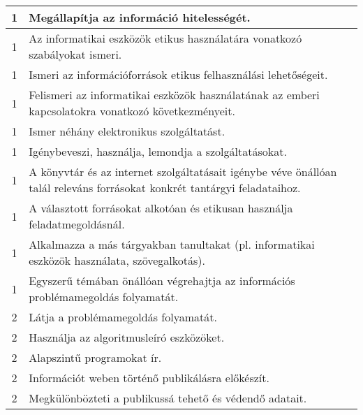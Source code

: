 \begin{longtable}{c | p{12cm} }
                                          1 &  Megállapítja az információ hitelességét. \\ \hline
                                          1 &  Az informatikai eszközök etikus használatára vonatkozó szabályokat ismeri. \\ \hline
                                          1 &  Ismeri az információforrások etikus felhasználási lehetőségeit. \\ \hline
                                          1 &  Felismeri az informatikai eszközök használatának az emberi kapcsolatokra vonatkozó következményeit. \\ \hline
                                          1 &  Ismer néhány elektronikus szolgáltatást. \\ \hline
                                          1 &  Igénybeveszi, használja, lemondja a szolgáltatásokat. \\ \hline
                                          1 &  A könyvtár és az internet szolgáltatásait igénybe véve önállóan talál releváns forrásokat konkrét tantárgyi feladataihoz. \\ \hline
                                          1 &  A választott forrásokat alkotóan és etikusan használja feladatmegoldásnál. \\ \hline
                                          1 &  Alkalmazza a más tárgyakban tanultakat (pl. informatikai eszközök használata, szövegalkotás). \\ \hline
                                          1 &  Egyszerű témában önállóan végrehajtja az információs problémamegoldás folyamatát. \\ \hline
                                      
                                
                                          2 &  Látja a problémamegoldás folyamatát. \\ \hline
                                          2 &  Használja az algoritmusleíró eszközöket. \\ \hline
                                          2 &  Alapszintű programokat ír. \\ \hline
                                          2 &  Információt weben történő publikálásra előkészít. \\ \hline
                                          2 &  Megkülönbözteti a publikussá tehető és védendő adatait. \\ \hline
                                      

\end{longtable}
